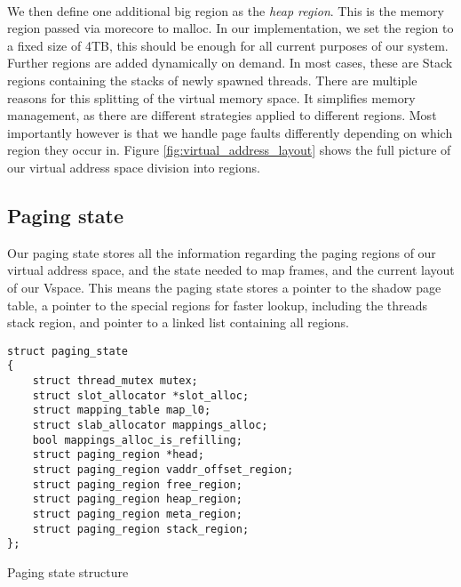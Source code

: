 \paragraph{}
We then define one additional big region as the \textit{heap region}. This is the memory region
passed via morecore to malloc. In our implementation, we set the region to a
fixed size of 4TB, this should be enough for all current purposes of our system. Further regions are added dynamically on demand. In most cases, these are Stack regions containing the stacks of newly spawned threads. There are multiple reasons for this splitting of the virtual memory space. It simplifies memory management, as there are different strategies applied to different
regions. Most importantly however is that we handle page faults differently
depending on which region they occur in. Figure \ref{fig:virtual_address_layout} shows the full picture of our virtual address space division into regions.

\subsection{Paging state} \label{paging_state}


Our paging state stores all the information regarding the paging regions of our virtual address space, and the state needed to map frames, and the current layout of our Vspace. This means the paging state stores a pointer to the shadow page table, a pointer to the special regions for faster lookup, including the threads stack region, and pointer to a linked list containing all regions.

\begin{code}
\begin{mdframed}[style=myframe]
\begin{verbatim}
struct paging_state
{
    struct thread_mutex mutex;
    struct slot_allocator *slot_alloc;      
    struct mapping_table map_l0;            
    struct slab_allocator mappings_alloc;   
    bool mappings_alloc_is_refilling;       
    struct paging_region *head;            
    struct paging_region vaddr_offset_region;  
    struct paging_region free_region;   
    struct paging_region heap_region;   
    struct paging_region meta_region;   
    struct paging_region stack_region;  
};

\end{verbatim}
\end{mdframed}
\caption{Paging state structure}
\newline
\label{code:paging_state }
\end{code}




